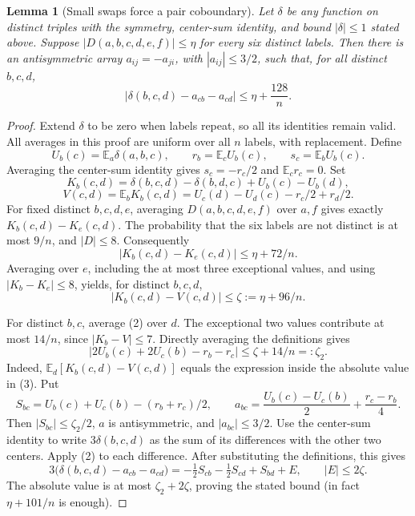 \documentclass[11pt]{article}
\newtheorem{lemma}[theorem]{Lemma}
\newcommand{\del}{\delta}
\begin{document}
\begin{lemma}[Small swaps force a pair coboundary]\label{coboundary}
Let $\del$ be any function on distinct triples with the symmetry,
center-sum identity, and bound $|\del|\le1$ stated above. Suppose
$|D(a,b,c,d,e,f)|\le\eta$ for every six distinct labels. Then there
is an antisymmetric array $a_{ij}=-a_{ji}$, with $|a_{ij}|\le3/2$,
such that, for all distinct $b,c,d$,
\[
 |\del(b,c,d)-a_{cb}-a_{cd}|\le\eta+\frac{128}{n}.
\]
\end{lemma}
\begin{proof}
Extend $\del$ to be zero when labels repeat, so all its identities
remain valid. All averages in this proof are uniform over all $n$ labels,
with replacement. Define
\[
 U_b(c)=\mathbb E_a\del(a,b,c),\qquad
 r_b=\mathbb E_c U_b(c),\qquad s_c=\mathbb E_b U_b(c).
\]
Averaging the center-sum identity gives $s_c=-r_c/2$ and
$\mathbb E_c r_c=0$. Set
\[
 K_b(c,d)=\del(b,c,d)-\del(b,d,c)+U_b(c)-U_b(d),
\]
\[
 V(c,d)=\mathbb E_b K_b(c,d)
       =U_c(d)-U_d(c)-r_c/2+r_d/2.
\]
For fixed distinct $b,c,d,e$, averaging $D(a,b,c,d,e,f)$ over $a,f$
gives exactly $K_b(c,d)-K_e(c,d)$. The probability that the six labels
are not distinct is at most $9/n$, and $|D|\le8$. Consequently
\[
 |K_b(c,d)-K_e(c,d)|\le\eta+72/n.
\]
Averaging over $e$, including the at most three exceptional values, and
using $|K_b-K_e|\le8$, yields, for distinct $b,c,d$,
\[
 |K_b(c,d)-V(c,d)|\le\zeta:=\eta+96/n.\tag{2}
\]

For distinct $b,c$, average (2) over $d$. The exceptional two values
contribute at most $14/n$, since $|K_b-V|\le7$. Directly averaging
the definitions gives
\[
 \left|2U_b(c)+2U_c(b)-r_b-r_c\right|
       \le\zeta+14/n=: \zeta_2.\tag{3}
\]
Indeed, $\mathbb E_d[K_b(c,d)-V(c,d)]$ equals the expression inside
the absolute value in (3).
Put
\[
 S_{bc}=U_b(c)+U_c(b)-(r_b+r_c)/2,
 \qquad
 a_{bc}=\frac{U_b(c)-U_c(b)}2+\frac{r_c-r_b}4.
\]
Then $|S_{bc}|\le\zeta_2/2$, $a$ is antisymmetric, and $|a_{bc}|\le3/2$.
Use the center-sum identity to write $3\del(b,c,d)$ as the sum of its
differences with the other two centers. Apply (2) to each difference.
After substituting the definitions, this gives
\[
 3\bigl(\del(b,c,d)-a_{cb}-a_{cd}\bigr)
   =-\tfrac12S_{cb}-\tfrac12S_{cd}+S_{bd}+E,
 \qquad |E|\le2\zeta.
\]
The absolute value is at most $\zeta_2+2\zeta$, proving the stated
bound (in fact $\eta+101/n$ is enough).
\end{proof}
\end{document}
